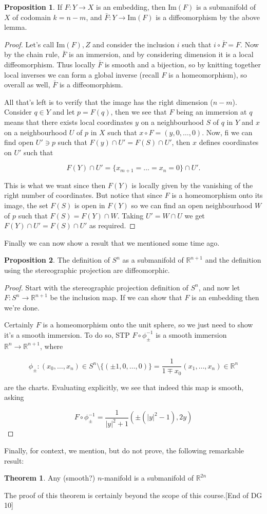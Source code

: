 \documentclass{article}
\theoremstyle{definition}
\newtheorem{proposition}{Proposition}
\newtheorem{theorem}{Theorem}
\begin{document}
\begin{proposition}
If $F: Y \to X$ is an embedding, then $\text{Im}(F)$ is a submanifold of $X$ of
codomain $k = n - m$, and $\bar{F} : Y \to \text{Im}(F)$ is a diffeomorphism by
the above lemma.
\end{proposition}

\begin{proof}
Let's call $\text{Im}(F), Z$ and consider the inclusion $i$ such that $i \circ
\bar{F} = F$. Now by the chain rule, $\bar{F}$ is an immersion, and by
considering dimension it is a local diffeomorphism. Thus locally $\bar{F}$ is
smooth and a bijection, so by knitting together local inverses we can form a
global inverse (recall $F$ is a homeomorphism), so overall as well, $\bar{F}$ is
a diffeomorphism.

All that's left is to verify that the image has the right dimension ($n - m$). Consider $q
\in Y$ and let $p = F(q)$, then we see that $F$ being an immersion at $q$ means
that there exists local coordinates $y$ on a neighbourhood $S$ of $q$ in $Y$ and
$x$ on a neighbourhood $U$ of $p$ in $X$ such that $x \circ F = (y, 0, \dots,
0)$. Now, fi we can find open $U' \ni p$ such that $F(y) \cap U' = F(S) \cap
U'$, then $x$ defines coordinates on $U'$ such that

$$ F(Y) \cap U' = \{x_{m + 1} = \dots = x_n = 0\} \cap U'. $$

This is what we want since then $F(Y)$ is locally given by the vanishing of the
right number of coordinates. But notice that since $F$ is a homeomorphism onto
its image, the set $F(S)$ is open in $F(Y)$ so we can find an open neighbourhood
$W$ of $p$ such that $F(S) = F(Y) \cap W$. Taking $U' = W \cap U$ we get $F(Y)
\cap U' = F(S) \cap U'$ as required.
\end{proof}

Finally we can now show a result that we mentioned some time ago.

\begin{proposition}
The definition of $S^n$ as a submanifold of $\mathbb{R}^{n + 1}$ and the
definition using the stereographic projection are diffeomorphic.
\end{proposition}
\begin{proof}
Start with the stereographic projection definition of $S^n$, and now let $F :
S^n \to \mathbb{R}^{n + 1}$ be the inclusion map. If we can show that $F$ is an
embedding then we're done.

Certainly $F$ is a homeomorphism onto the unit sphere, so we just need to show
it's a smooth immersion. To do so, STP $F \circ \phi_{\pm}^{-1}$ is a smooth
immersion $\mathbb{R}^n \to \mathbb{R}^{n + 1}$, where 

$$ \phi_\pm : (x_0, \dots, x_n) \in S^n \setminus \{(\pm 1, 0, \dots, 0)\} =
\frac{1}{1 \mp x_0} (x_1, \dots, x_n) \in \mathbb{R}^n $$

are the charts. Evaluating explicitly, we see that indeed this map is smooth,
asking

$$ F \circ \phi_\pm^{-1} = \frac{1}{|y|^2 + 1} (\pm (|y|^2 - 1), 2y) $$
\end{proof}

Finally, for context, we mention, but do not prove, the following remarkable
result:

\begin{theorem}
  Any (smooth?) $n$-manifold is a submanifold of $\mathbb{R}^{2n}$
\end{theorem}

The proof of this theorem is certainly beyond the scope of this course.[End of
DG 10]
\end{document}
